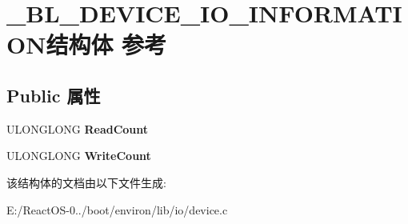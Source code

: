 \hypertarget{struct___b_l___d_e_v_i_c_e___i_o___i_n_f_o_r_m_a_t_i_o_n}{}\section{\+\_\+\+B\+L\+\_\+\+D\+E\+V\+I\+C\+E\+\_\+\+I\+O\+\_\+\+I\+N\+F\+O\+R\+M\+A\+T\+I\+O\+N结构体 参考}
\label{struct___b_l___d_e_v_i_c_e___i_o___i_n_f_o_r_m_a_t_i_o_n}
\subsection*{Public 属性}
\begin{DoxyCompactItemize}
\item 
\mbox{\label{struct___b_l___d_e_v_i_c_e___i_o___i_n_f_o_r_m_a_t_i_o_n_a32fbd7e7310a810ca172beeaa85cbdaf}} 
U\+L\+O\+N\+G\+L\+O\+NG {\bfseries Read\+Count}
\item 
\mbox{\label{struct___b_l___d_e_v_i_c_e___i_o___i_n_f_o_r_m_a_t_i_o_n_a0714033c32c6b3ee56835be5759f641a}} 
U\+L\+O\+N\+G\+L\+O\+NG {\bfseries Write\+Count}
\end{DoxyCompactItemize}


该结构体的文档由以下文件生成\+:\begin{DoxyCompactItemize}
\item 
E\+:/\+React\+O\+S-\/0../boot/environ/lib/io/device.\+c\end{DoxyCompactItemize}
